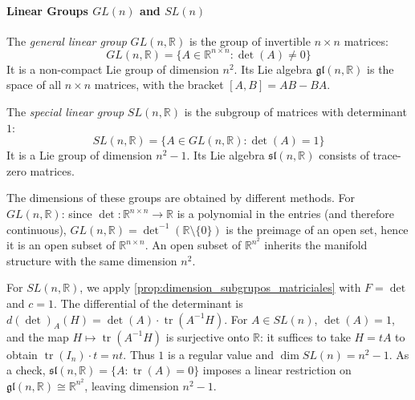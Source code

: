 \paragraph{Linear Groups $GL(n)$ and $SL(n)$}

\begin{definition}\label{def:grupo_gl_n}
The \textit{general linear group} $GL(n, \mathbb{R})$ is the group of invertible $n \times n$ matrices:
\begin{equation}
GL(n, \mathbb{R}) = \{A \in \mathbb{R}^{n \times n} : \det(A) \neq 0\}
\end{equation}
It is a non-compact Lie group of dimension $n^2$. Its Lie algebra $\mathfrak{gl}(n, \mathbb{R})$ is the space of all $n \times n$ matrices, with the bracket $[A, B] = AB - BA$.
\end{definition}

\begin{definition}\label{def:grupo_sl_n}
The \textit{special linear group} $SL(n, \mathbb{R})$ is the subgroup of matrices with determinant $1$:
\begin{equation}
SL(n, \mathbb{R}) = \{A \in GL(n, \mathbb{R}) : \det(A) = 1\}
\end{equation}
It is a Lie group of dimension $n^2 - 1$. Its Lie algebra $\mathfrak{sl}(n, \mathbb{R})$ consists of trace-zero matrices.
\end{definition}

The dimensions of these groups are obtained by different methods. For $GL(n, \mathbb{R})$: since $\det: \mathbb{R}^{n \times n} \to \mathbb{R}$ is a polynomial in the entries (and therefore continuous), $GL(n, \mathbb{R}) = \det^{-1}(\mathbb{R} \setminus \{0\})$ is the preimage of an open set, hence it is an open subset of $\mathbb{R}^{n \times n}$. An open subset of $\mathbb{R}^{n^2}$ inherits the manifold structure with the same dimension $n^2$.

For $SL(n, \mathbb{R})$, we apply \autoref{prop:dimension_subgrupos_matriciales} with $F = \det$ and $c = 1$. The differential of the determinant is $d(\det)_A(H) = \det(A) \cdot \operatorname{tr}(A^{-1}H)$. For $A \in SL(n)$, $\det(A) = 1$, and the map $H \mapsto \operatorname{tr}(A^{-1}H)$ is surjective onto $\mathbb{R}$: it suffices to take $H = tA$ to obtain $\operatorname{tr}(I_n) \cdot t = nt$. Thus $1$ is a regular value and $\dim SL(n) = n^2 - 1$. As a check, $\mathfrak{sl}(n, \mathbb{R}) = \{A : \operatorname{tr}(A) = 0\}$ imposes a linear restriction on $\mathfrak{gl}(n, \mathbb{R}) \cong \mathbb{R}^{n^2}$, leaving dimension $n^2 - 1$.

